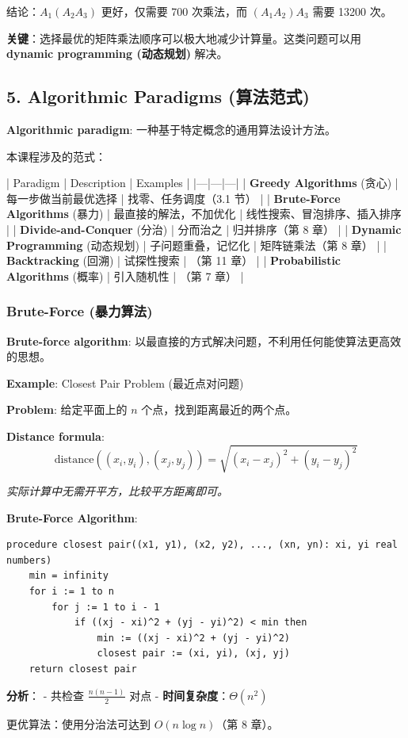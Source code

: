 \documentclass[10pt,a4paper,openany]{ctexbook}
\theoremstyle{definition}
\theoremstyle{remark}
\renewenvironment{quote}
  {\list{}{\leftmargin=1em\rightmargin=0pt\topsep=0.5pt\partopsep=0pt}\item[]}
  {\endlist}
\begin{document}
\begin{quote}
结论：$A_1(A_2A_3)$ 更好，仅需要 700 次乘法，而 $(A_1A_2)A_3$ 需要 13200 次。

\textbf{关键}：选择最优的矩阵乘法顺序可以极大地减少计算量。这类问题可以用 \textbf{dynamic programming (动态规划)} 解决。

\end{quote}
\vspace{-2pt}

\subsection{5. Algorithmic Paradigms (算法范式)}

\begin{quote}
\textbf{Algorithmic paradigm}: 一种基于特定概念的通用算法设计方法。

本课程涉及的范式：

| Paradigm | Description | Examples |
|---|---|---|
| \textbf{Greedy Algorithms} (贪心) | 每一步做当前最优选择 | 找零、任务调度（3.1 节） |
| \textbf{Brute-Force Algorithms} (暴力) | 最直接的解法，不加优化 | 线性搜索、冒泡排序、插入排序 |
| \textbf{Divide-and-Conquer} (分治) | 分而治之 | 归并排序（第 8 章） |
| \textbf{Dynamic Programming} (动态规划) | 子问题重叠，记忆化 | 矩阵链乘法（第 8 章） |
| \textbf{Backtracking} (回溯) | 试探性搜索 | （第 11 章） |
| \textbf{Probabilistic Algorithms} (概率) | 引入随机性 | （第 7 章） |

\end{quote}

\subsubsection{Brute-Force (暴力算法)}

\begin{quote}
\textbf{Brute-force algorithm}: 以最直接的方式解决问题，不利用任何能使算法更高效的思想。

\textbf{Example}: Closest Pair Problem (最近点对问题)

\textbf{Problem}: 给定平面上的 $n$ 个点，找到距离最近的两个点。

\textbf{Distance formula}:
\[
\text{distance}((x_i, y_i), (x_j, y_j)) = \sqrt{(x_i - x_j)^2 + (y_i - y_j)^2}
\]


\textit{实际计算中无需开平方，比较平方距离即可。}

\textbf{Brute-Force Algorithm}:
{\footnotesize\begin{verbatim}
procedure closest pair((x1, y1), (x2, y2), ..., (xn, yn): xi, yi real numbers)
    min = infinity
    for i := 1 to n
        for j := 1 to i - 1
            if ((xj - xi)^2 + (yj - yi)^2) < min then
                min := ((xj - xi)^2 + (yj - yi)^2)
                closest pair := (xi, yi), (xj, yj)
    return closest pair
\end{verbatim}}


\textbf{分析}：
- 共检查 $\frac{n(n-1)}{2}$ 对点
- \textbf{时间复杂度}：$\Theta(n^2)$

更优算法：使用分治法可达到 $O(n \log n)$（第 8 章）。

\end{quote}
\vspace{-2pt}
\end{document}
